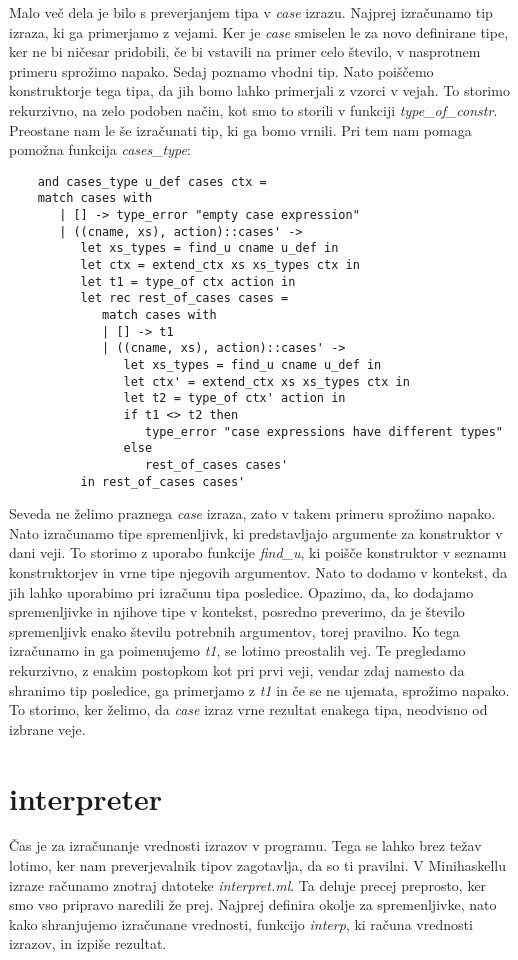 \documentclass[12pt,a4paper,openany]{book}
\begin{document}
Malo več dela je bilo s preverjanjem tipa v \emph{case} izrazu. Najprej izračunamo tip izraza, ki ga primerjamo z vejami. Ker je \emph{case} smiselen le za novo definirane tipe, ker ne bi ničesar 
pridobili, če bi vstavili na primer celo število, v nasprotnem primeru sprožimo napako. Sedaj poznamo vhodni tip. Nato poiščemo konstruktorje tega tipa, da jih bomo lahko primerjali z vzorci v vejah.
To storimo rekurzivno, na zelo podoben način, kot smo to storili v funkciji \emph{type\_of\_constr}. Preostane nam le še izračunati tip, ki ga bomo vrnili. Pri tem nam pomaga pomožna funkcija 
\emph{cases\_type}:
\begin{lstlisting}
	and cases_type u_def cases ctx =
	match cases with
	   | [] -> type_error "empty case expression"
	   | ((cname, xs), action)::cases' ->
		  let xs_types = find_u cname u_def in
		  let ctx = extend_ctx xs xs_types ctx in
		  let t1 = type_of ctx action in
		  let rec rest_of_cases cases =
			 match cases with
			 | [] -> t1
			 | ((cname, xs), action)::cases' ->
				let xs_types = find_u cname u_def in
				let ctx' = extend_ctx xs xs_types ctx in
				let t2 = type_of ctx' action in
				if t1 <> t2 then
				   type_error "case expressions have different types"
				else
				   rest_of_cases cases'
		  in rest_of_cases cases'
\end{lstlisting}
Seveda ne želimo praznega \emph{case} izraza, zato v takem primeru sprožimo napako. Nato izračunamo tipe spremenljivk, ki predstavljajo argumente za konstruktor v dani veji. To storimo z uporabo
funkcije \emph{find\_u}, ki poišče konstruktor v seznamu konstruktorjev in vrne tipe njegovih argumentov. Nato to dodamo v kontekst, da jih lahko uporabimo pri izračunu tipa posledice. Opazimo, 
da, ko dodajamo spremenljivke in njihove tipe v kontekst, posredno preverimo, da je število spremenljivk enako številu potrebnih argumentov, torej pravilno. Ko tega izračunamo in ga 
poimenujemo \emph{t1}, se lotimo preostalih vej. Te pregledamo rekurzivno, z enakim postopkom kot pri prvi veji, vendar zdaj namesto da shranimo tip posledice, ga primerjamo z \emph{t1} in če 
se ne ujemata, sprožimo napako. To storimo, ker želimo, da \emph{case} izraz vrne rezultat enakega tipa, neodvisno od izbrane veje.

\section{interpreter}
Čas je za izračunanje vrednosti izrazov v programu. Tega se lahko brez težav lotimo, ker nam preverjevalnik tipov zagotavlja, da so ti pravilni. V Minihaskellu izraze računamo znotraj datoteke 
\emph{interpret.ml}. Ta deluje precej preprosto, ker smo vso pripravo naredili že prej. Najprej definira okolje za spremenljivke, nato kako shranjujemo izračunane vrednosti, funkcijo 
\emph{interp}, ki računa vrednosti izrazov, in izpiše rezultat. 
\end{document}
